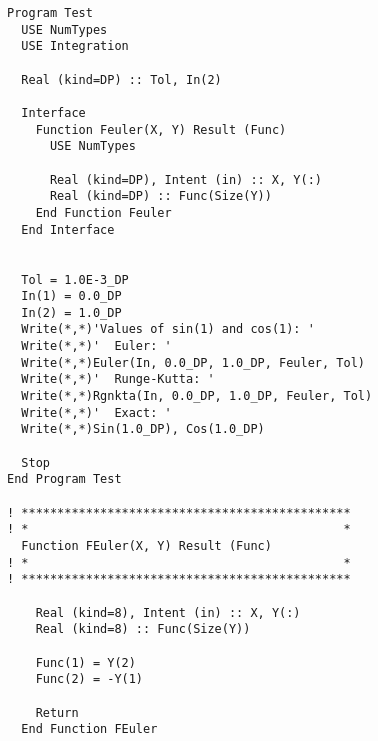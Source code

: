 \begin{verbatim}
Program Test
  USE NumTypes
  USE Integration

  Real (kind=DP) :: Tol, In(2)

  Interface
    Function Feuler(X, Y) Result (Func)
      USE NumTypes

      Real (kind=DP), Intent (in) :: X, Y(:)
      Real (kind=DP) :: Func(Size(Y))
    End Function Feuler
  End Interface


  Tol = 1.0E-3_DP
  In(1) = 0.0_DP
  In(2) = 1.0_DP
  Write(*,*)'Values of sin(1) and cos(1): '
  Write(*,*)'  Euler: '
  Write(*,*)Euler(In, 0.0_DP, 1.0_DP, Feuler, Tol)
  Write(*,*)'  Runge-Kutta: '
  Write(*,*)Rgnkta(In, 0.0_DP, 1.0_DP, Feuler, Tol)
  Write(*,*)'  Exact: '
  Write(*,*)Sin(1.0_DP), Cos(1.0_DP)

  Stop
End Program Test

! **********************************************  
! *                                            *
  Function FEuler(X, Y) Result (Func)
! *                                            *
! **********************************************

    Real (kind=8), Intent (in) :: X, Y(:)
    Real (kind=8) :: Func(Size(Y))

    Func(1) = Y(2)
    Func(2) = -Y(1)
    
    Return
  End Function FEuler
\end{verbatim}

